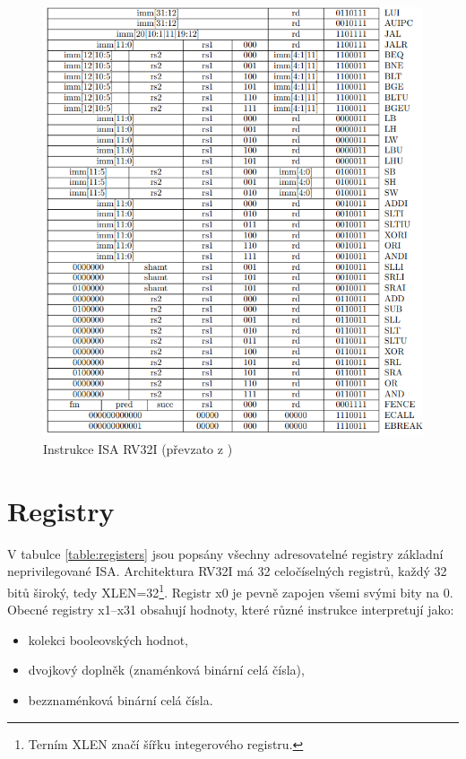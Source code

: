 \documentclass[FM,BP]{tulthesis}
\begin{document}
\begin{figure}[h]
    \includegraphics[scale=0.8]{assets/RV32I_instructions_small.png}
    \centering
    \caption{Instrukce ISA RV32I (převzato z \cite{RISC-V})}
    \label{img:RISC-V_insturctions}
\end{figure}

\section{Registry}
V tabulce \ref{table:registers} jsou popsány všechny adresovatelné registry základní neprivilegované ISA. Architektura RV32I má 32 celočíselných registrů, každý 32 bitů široký, tedy XLEN=32\footnote{Terním XLEN značí šířku integerového registru.}. Registr x0 je pevně zapojen všemi svými bity na 0. Obecné registry x1–x31 obsahují hodnoty, které různé instrukce interpretují jako:
\begin{itemize}
    \item kolekci booleovských hodnot,
    \item dvojkový doplněk (znaménková binární celá čísla), 
    \item bezznaménková binární celá čísla.
\end{itemize}
\end{document}
